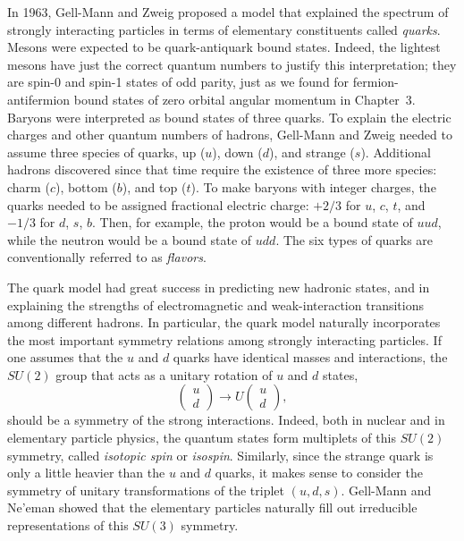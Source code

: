 In 1963, Gell-Mann and Zweig proposed a model that explained the spectrum of
strongly interacting particles in terms of elementary constituents called
\emph{quarks}.  Mesons were expected to be quark-antiquark bound states.
Indeed, the lightest mesons have just the correct quantum numbers to justify
this interpretation; they are spin-0 and spin-1 states of odd parity, just as
we found for fermion-antifermion bound states of zero orbital angular
momentum in Chapter~3.  Baryons were interpreted as bound states of three
quarks.  To explain the electric charges and other quantum numbers of
hadrons, Gell-Mann and Zweig needed to assume three species of quarks, up
($u$), down ($d$), and strange ($s$).  Additional hadrons discovered since
that time require the existence of three more species: charm ($c$), bottom
($b$), and top ($t$).  To make baryons with integer charges, the quarks
needed to be assigned fractional electric charge: $+2/3$ for $u$, $c$, $t$,
and $-1/3$ for $d$, $s$, $b$.  Then, for example, the proton would be a bound
state of $uud$, while the neutron would be a bound state of $udd$.  The six
types of quarks are conventionally referred to as \emph{flavors}.

The quark model had great success in predicting new hadronic states, and in
explaining the strengths of electromagnetic and weak-interaction transitions
among different hadrons.  In particular, the quark model naturally
incorporates the most important symmetry relations among strongly interacting
particles.  If one assumes that the $u$ and $d$ quarks have identical masses
and interactions, the $SU(2)$ group that acts as a unitary rotation of $u$ and
$d$ states,
\begin{equation}
  \begin{pmatrix}u\\ d\end{pmatrix} \to U\begin{pmatrix}u\\ d\end{pmatrix},
  \label{eq:17.1}
\end{equation}
should be a symmetry of the strong interactions.  Indeed, both in nuclear and
in elementary particle physics, the quantum states form multiplets of this
$SU(2)$ symmetry, called \emph{isotopic spin} or \emph{isospin}.  Similarly,
since the strange quark is only a little heavier than the $u$ and $d$ quarks,
it makes sense to consider the symmetry of unitary transformations of the
triplet $(u, d, s)$.  Gell-Mann and Ne'eman showed that the elementary
particles naturally fill out irreducible representations of this $SU(3)$
symmetry.

